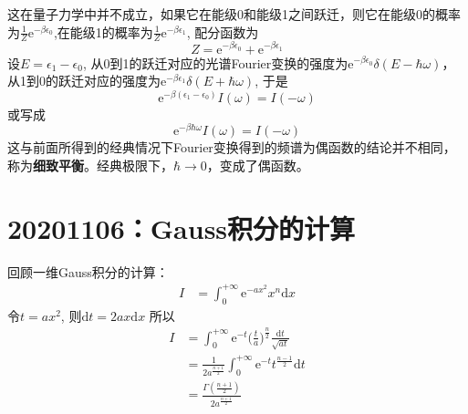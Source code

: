\documentclass[12pt]{article}
\begin{document}
    这在量子力学中并不成立，如果它在能级0和能级1之间跃迁，则它在能级0的概率为$\frac 1Z \mathrm{e}^{-\beta \epsilon_0}$,在能级1的概率为$\frac 1Z \mathrm{e}^{-\beta \epsilon_1}$, 配分函数为
    \begin{equation}
    Z = \mathrm{e}^{-\beta \epsilon_0} + \mathrm{e}^{-\beta \epsilon_1}
    \end{equation}
    设$E = \epsilon_1 - \epsilon_0$, 从0到1的跃迁对应的光谱Fourier变换的强度为$\mathrm{e}^{-\beta \epsilon_0} \delta(E - \hbar \omega)$，从1到0的跃迁对应的强度为$\mathrm{e}^{-\beta \epsilon_1} \delta(E + \hbar \omega)$, 于是
    \begin{equation}
    \mathrm{e}^{-\beta(\epsilon_1 - \epsilon_0)} I(\omega) = I(-\omega)
    \end{equation}
    或写成
    \begin{equation}
        \mathrm{e}^{-\beta \hbar \omega}I(\omega) = I(-\omega)
    \end{equation}
    这与前面所得到的经典情况下Fourier变换得到的频谱为偶函数的结论并不相同，称为\textbf{细致平衡}。经典极限下，$\hbar \to 0$，变成了偶函数。

\section{20201106：Gauss积分的计算}

    回顾一维Gauss积分的计算：
    \begin{equation}\begin{aligned}
        I &= \int_0^{+\infty} \mathrm{e}^{-ax^2} x^{n} \mathrm{d}x
    \end{aligned}\end{equation}
    令$t = ax^2$, 则$\mathrm{d}t = 2ax\mathrm{d}x$
    所以
    \begin{equation}\begin{aligned}
    I &= \int_0^{+\infty} \mathrm{e}^{-t} \bigg(\frac ta\bigg)^{\frac n2} \frac {\mathrm{d}t}{\sqrt{at}}\\
    &= \frac 1{2a^{\frac {n+1}2}} \int_0^{+\infty} \mathrm{e}^{-t} t^{\frac {n-1}2} \mathrm{d}t\\
    &= \frac {\Gamma(\frac {n+1}2)}{2a^{\frac {n+1}2}}
    \end{aligned}\end{equation}
\end{document}
